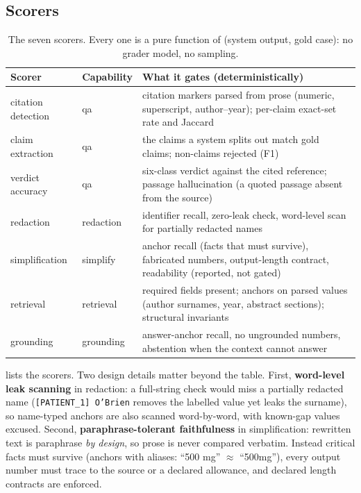 \documentclass[11pt,a4paper]{article}
\begin{document}
\subsection{Scorers}

\begin{table}[t]
\centering
\small
\begin{tabularx}{\textwidth}{l l X}
\toprule
\textbf{Scorer} & \textbf{Capability} & \textbf{What it gates (deterministically)}\\
\midrule
citation detection & qa & citation markers parsed from prose (numeric, superscript, author--year); per-claim exact-set rate and Jaccard\\
claim extraction & qa & the claims a system splits out match gold claims; non-claims rejected (F1)\\
verdict accuracy & qa & six-class verdict against the cited reference; passage hallucination (a quoted passage absent from the source)\\
redaction & redaction & identifier recall, zero-leak check, word-level scan for partially redacted names\\
simplification & simplify & anchor recall (facts that must survive), fabricated numbers, output-length contract, readability (reported, not gated)\\
retrieval & retrieval & required fields present; anchors on parsed values (author surnames, year, abstract sections); structural invariants\\
grounding & grounding & answer-anchor recall, no ungrounded numbers, abstention when the context cannot answer\\
\bottomrule
\end{tabularx}
\caption{The seven scorers. Every one is a pure function of (system output, gold case): no grader
model, no sampling.}
\label{tab:scorers}
\end{table}

 lists the scorers. Two design details matter beyond the table. First,
\textbf{word-level leak scanning} in redaction: a full-string check would miss a partially redacted
name (\texttt{[PATIENT\_1] O'Brien} removes the labelled value yet leaks the surname), so name-typed
anchors are also scanned word-by-word, with known-gap values excused. Second,
\textbf{paraphrase-tolerant faithfulness} in simplification: rewritten text is paraphrase \emph{by
design}, so prose is never compared verbatim. Instead critical facts must survive (anchors with
aliases: ``500 mg'' $\approx$ ``500mg''), every output number must trace to the source or a declared
allowance, and declared length contracts are enforced.
\end{document}
